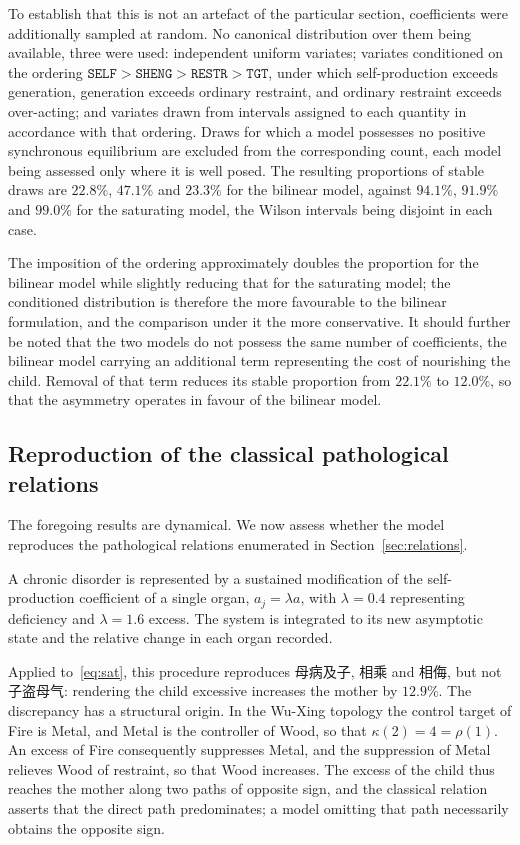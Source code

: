 \documentclass[11pt]{article}
\theoremstyle{definition}
\theoremstyle{remark}
\begin{document}
	To establish that this is not an artefact of the particular section, coefficients
	were additionally sampled at random. No canonical distribution over them being
	available, three were used: independent uniform variates; variates conditioned on
	the ordering $\texttt{SELF}>\texttt{SHENG}>\texttt{RESTR}>\texttt{TGT}$, under which
	self-production exceeds generation, generation exceeds ordinary restraint, and
	ordinary restraint exceeds over-acting; and variates drawn from intervals assigned
	to each quantity in accordance with that ordering. Draws for which a model possesses
	no positive synchronous equilibrium are excluded from the corresponding count, each
	model being assessed only where it is well posed. The resulting proportions of
	stable draws are $22.8\%$, $47.1\%$ and $23.3\%$ for the bilinear model, against
	$94.1\%$, $91.9\%$ and $99.0\%$ for the saturating model, the Wilson intervals being
	disjoint in each case.
	
	The imposition of the ordering approximately doubles the proportion for the bilinear
	model while slightly reducing that for the saturating model; the conditioned
	distribution is therefore the more favourable to the bilinear formulation, and the
	comparison under it the more conservative. It should further be noted that the two
	models do not possess the same number of coefficients, the bilinear model carrying
	an additional term representing the cost of nourishing the child. Removal of that
	term reduces its stable proportion from $22.1\%$ to $12.0\%$, so that the asymmetry
	operates in favour of the bilinear model.
	
	\subsection{Reproduction of the classical pathological relations}\label{sec:pathologies}
	
	The foregoing results are dynamical. We now assess whether the model reproduces the
	pathological relations enumerated in Section~\ref{sec:relations}.
	
	A chronic disorder is represented by a sustained modification of the self-production
	coefficient of a single organ, $a_j=\lambda a$, with $\lambda=0.4$ representing
	deficiency and $\lambda=1.6$ excess. The system is integrated to its new asymptotic
	state and the relative change in each organ recorded.
	
	Applied to~\eqref{eq:sat}, this procedure reproduces 母病及子, 相乘 and
	相侮, but not 子盗母气: rendering the child excessive increases the
	mother by $12.9\%$. The discrepancy has a structural origin. In the Wu-Xing topology
	the control target of Fire is Metal, and Metal is the controller of Wood, so that
	$\kappa(2)=4=\rho(1)$. An excess of Fire consequently suppresses Metal, and the
	suppression of Metal relieves Wood of restraint, so that Wood increases. The excess
	of the child thus reaches the mother along two paths of opposite sign, and the
	classical relation asserts that the direct path predominates; a model omitting that
	path necessarily obtains the opposite sign.
	
\end{document}
